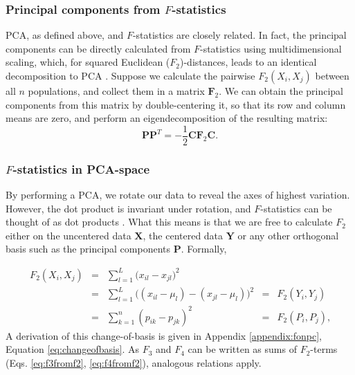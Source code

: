 \documentclass[12pt,fullpage, a4paper]{article}
\newcommand{\MX}{\mathbf{X}} %
\newcommand{\MC}{\mathbf{C}} %
\newcommand{\MY}{\mathbf{Y}} %
\newcommand{\MF}{\mathbf{F}_2} %
\newcommand{\MP}{\mathbf{P}} %
\begin{document}
\subsubsection{Principal components from $F$-statistics}
PCA, as defined above, and $F$-statistics are closely related. In fact, the principal components can be directly calculated from $F$-statistics using multidimensional scaling, which, for squared Euclidean ($F_2$)-distances, leads to an identical decomposition to PCA \citep{gower1966}. Suppose we calculate the pairwise $F_2(X_i, X_j)$ between all $n$ populations, and collect them in a matrix $\MF$. We can obtain the principal components from this matrix by double-centering it, so that its row and column means are zero, and perform an eigendecomposition of the resulting matrix:
\begin{equation}
\MP\MP^T = - \frac{1}{2}\MC\MF\MC \text{.} \label{eq:mds}
\end{equation}

\subsubsection{$F$-statistics in PCA-space}
By performing a PCA, we rotate our data to reveal the axes of highest variation. However, the dot product is invariant under rotation, and $F$-statistics can be thought of as dot products \citep{oteo-garcia2021}.  What this means is that we are free to calculate $F_2$ either on the uncentered data $\MX$, the centered data $\MY$ or any other orthogonal basis such as the principal components $\MP$. Formally,

\begin{align}
F_2(X_i, X_j) &=&  \sum_{l=1}^L \big( x_{il} -x_{jl}\big)^2  &&\nonumber\\ 
&=& \sum_{l=1}^L \big( (x_{il} - \mu_l) -(x_{jl} -\mu_l)\big)^2   &=& F_2(Y_i, Y_j) \nonumber\\
&=& \sum_{k=1}^n (p_{ik} - p_{jk})^2  &=& F_2(P_i, P_j) \text{,}\label{eq:fpc}
\end{align}
A derivation of this change-of-basis is given in Appendix \ref{appendix:fonpc}, Equation \ref{eq:changeofbasis}.
As $F_3$ and $F_4$ can be written as sums of $F_2$-terms (Eqs. \ref{eq:f3fromf2}, \ref{eq:f4fromf2}), analogous relations apply.
\end{document}
